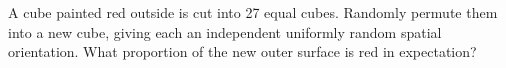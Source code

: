 A cube painted red outside is cut into 27 equal cubes. Randomly permute them into a new cube, giving each an independent uniformly random spatial orientation. What proportion of the new outer surface is red in expectation?
